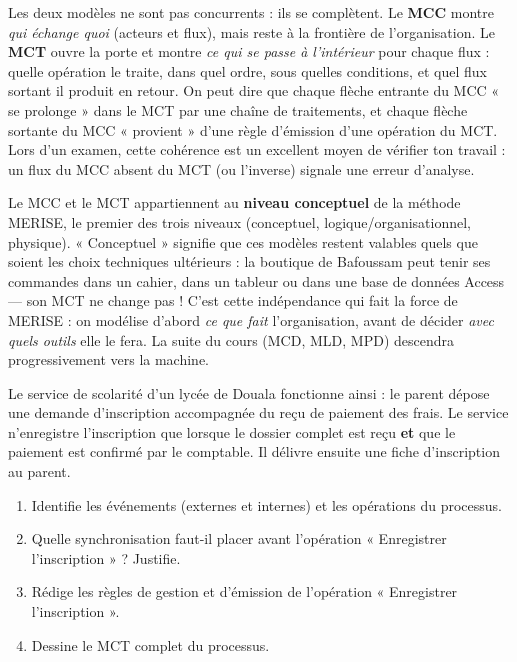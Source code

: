 \documentclass[11pt]{article}
\newcounter{popsec}
\newcounter{popsub}
\newcommand{\courssub}[1]{%
  \stepcounter{popsub}%
  \par\vspace{9pt}\noindent{\popxbold\fontsize{11.5}{13}\selectfont\color{popink}{\color{poporange}\thepopsec.\thepopsub}\hspace{6pt}#1}\par\nopagebreak\vspace{4pt}
}
\begin{document}
\courssub{Le lien entre le MCC et le MCT}

Les deux modèles ne sont pas concurrents : ils se complètent. Le \textbf{MCC} montre \emph{qui échange quoi} (acteurs et flux), mais reste à la frontière de l'organisation. Le \textbf{MCT} ouvre la porte et montre \emph{ce qui se passe à l'intérieur} pour chaque flux : quelle opération le traite, dans quel ordre, sous quelles conditions, et quel flux sortant il produit en retour. On peut dire que chaque flèche entrante du MCC « se prolonge » dans le MCT par une chaîne de traitements, et chaque flèche sortante du MCC « provient » d'une règle d'émission d'une opération du MCT. Lors d'un examen, cette cohérence est un excellent moyen de vérifier ton travail : un flux du MCC absent du MCT (ou l'inverse) signale une erreur d'analyse.

\begin{savaistu}
Le MCC et le MCT appartiennent au \textbf{niveau conceptuel} de la méthode MERISE, le premier des trois niveaux (conceptuel, logique/organisationnel, physique). « Conceptuel » signifie que ces modèles restent valables quels que soient les choix techniques ultérieurs : la boutique de Bafoussam peut tenir ses commandes dans un cahier, dans un tableur ou dans une base de données Access — son MCT ne change pas ! C'est cette indépendance qui fait la force de MERISE : on modélise d'abord \emph{ce que fait} l'organisation, avant de décider \emph{avec quels outils} elle le fera. La suite du cours (MCD, MLD, MPD) descendra progressivement vers la machine.
\end{savaistu}

\begin{exercice}
Le service de scolarité d'un lycée de Douala fonctionne ainsi : le parent dépose une demande d'inscription accompagnée du reçu de paiement des frais. Le service n'enregistre l'inscription que lorsque le dossier complet est reçu \textbf{et} que le paiement est confirmé par le comptable. Il délivre ensuite une fiche d'inscription au parent.
\begin{enumerate}
\item Identifie les événements (externes et internes) et les opérations du processus.
\item Quelle synchronisation faut-il placer avant l'opération « Enregistrer l'inscription » ? Justifie.
\item Rédige les règles de gestion et d'émission de l'opération « Enregistrer l'inscription ».
\item Dessine le MCT complet du processus.
\end{enumerate}
\end{exercice}
\end{document}
